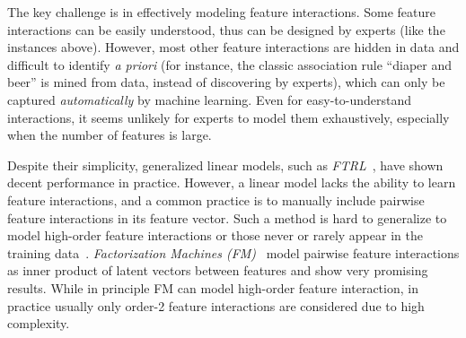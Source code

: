 The key challenge is in effectively modeling feature interactions. Some feature interactions can be easily understood, thus can be designed by experts (like the instances above). However, most other feature interactions are hidden in data and difficult to identify \emph{a priori} (for instance, the classic association rule ``diaper and beer'' is mined from data, instead of discovering by experts), which can only be captured \emph{automatically} by machine learning. Even for easy-to-understand interactions, it seems unlikely for experts to model them exhaustively, especially when the number of features is large.

%

Despite their simplicity, generalized linear models, such as \emph{FTRL}~\cite{FTRL}, have shown decent performance in practice. However, a linear model lacks the ability to learn feature interactions, and a common practice is to manually include pairwise feature interactions in its feature vector. Such a method is hard to generalize to model high-order feature interactions or those never or rarely appear in the training data~\cite{fm}. \emph{Factorization Machines (FM)}~\cite{fm} model pairwise feature interactions as inner product of latent vectors between features and show very promising results. While in principle FM can model high-order feature interaction, in practice usually only order-2 feature interactions are considered due to high complexity.




